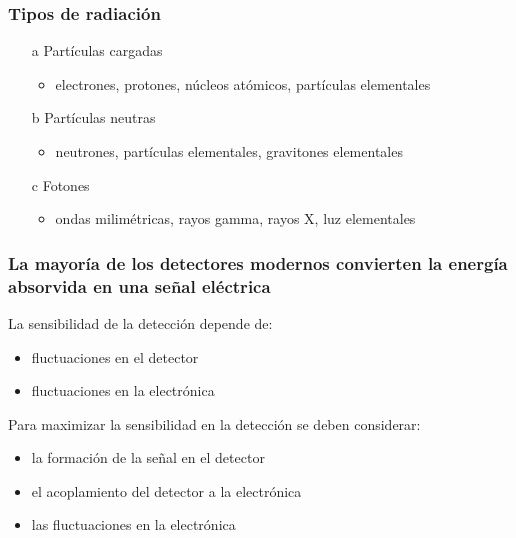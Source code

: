 \documentclass{beamer}
\begin{document}
\begin{frame}
\frametitle{Tipos de radiaci\'on}
\begin{alertblock}{}
\begin{itemize}
\item[a] Part\'iculas cargadas 
\begin{itemize}
\item {\color{blue}electrones, protones, n\'ucleos at\'omicos, part\'iculas
elementales} 
\end{itemize}
\item[b] Part\'iculas neutras 
				\begin{itemize}
\item {\color{blue}neutrones, part\'iculas elementales, gravitones
elementales} 
				\end{itemize}
\item[c] Fotones 
				\begin{itemize}
\item {\color{blue}ondas milim\'etricas, rayos gamma, rayos X, luz
elementales} 
				\end{itemize}
				\end{itemize}
				\end{alertblock}
				\end{frame}

				\begin{frame}
\frametitle{La mayor\'ia de los detectores modernos convierten la
energ\'ia absorvida en una señal el\'ectrica}
\begin{alertblock}{La sensibilidad de la detecci\'on depende de:}
\begin{itemize}
\item fluctuaciones en el detector
\item fluctuaciones en la electr\'onica
\end{itemize}
\end{alertblock}
\begin{exampleblock}{Para maximizar la sensibilidad en la detecci\'on se
deben considerar:}
\begin{itemize}
\item la formaci\'on de la señal en el detector
\item el acoplamiento del detector a la electr\'onica
\item las fluctuaciones en la electr\'onica
\end{itemize}
\end{exampleblock}
\end{frame}
\end{document}
